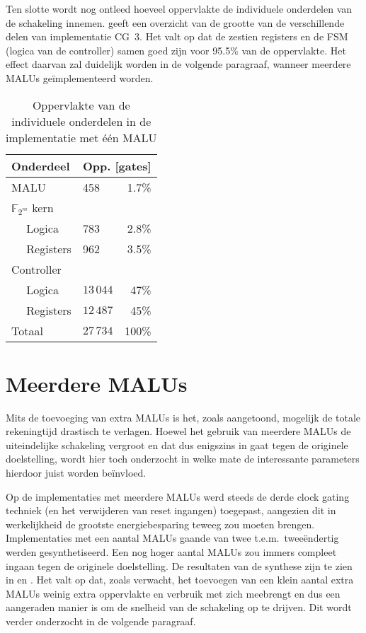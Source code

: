 Ten slotte wordt nog ontleed hoeveel oppervlakte de individuele onderdelen van de schakeling innemen.  geeft een overzicht van de grootte van de verschillende delen van implementatie CG~3. Het valt op dat de zestien registers en de FSM (logica van de controller) samen goed zijn voor 95.5\% van de oppervlakte. Het effect daarvan zal duidelijk worden in de volgende paragraaf, wanneer meerdere MALUs ge\"implementeerd worden.

\begin{table}[h]
	\caption{Oppervlakte van de individuele onderdelen in de implementatie met \'e\'en MALU}
	\label{tabel-resultaten-onderdelen}

	\centering
	\begin{tabular}{llr}
		\toprule
		Onderdeel					& \multicolumn{2}{c}{Opp. [gates]}\\
		\midrule
		MALU				 			& 458			& 1.7\%\\
		$\mathbb{F}_{2^m}$ kern	&				& \\
		$\quad$ Logica				& 783			& 2.8\%\\
		$\quad$ Registers			& 962			& 3.5\%\\
		Controller					&				& \\
		$\quad$ Logica				& $13\,044$	& 47\%\\
		$\quad$ Registers			& $12\,487$	& 45\%\\
		\midrule
		Totaal						& $27\,734$	& 100\%\\
		\bottomrule		
	\end{tabular}
\end{table}


\section{Meerdere MALUs\label{sectie-resulaten-malus}}

Mits de toevoeging van extra MALUs is het, zoals aangetoond, mogelijk de totale rekeningtijd drastisch te verlagen. Hoewel het gebruik van meerdere MALUs de uiteindelijke schakeling vergroot en dat dus enigszins in gaat tegen de originele doelstelling, wordt hier toch onderzocht in welke mate de interessante parameters hierdoor juist worden be\"invloed.

Op de implementaties met meerdere MALUs werd steeds de derde clock gating techniek (en het verwijderen van reset ingangen) toegepast, aangezien dit in werkelijkheid de grootste energiebesparing teweeg zou moeten brengen. Implementaties met een aantal MALUs gaande van twee t.e.m.\ twee\"endertig werden gesynthetiseerd. Een nog hoger aantal MALUs zou immers compleet ingaan tegen de originele doelstelling. De resultaten van de synthese zijn te zien in  en . Het valt op dat, zoals verwacht, het toevoegen van een klein aantal extra MALUs weinig extra oppervlakte en verbruik met zich meebrengt en dus een aangeraden manier is om de snelheid van de schakeling op te drijven. Dit wordt verder onderzocht in de volgende paragraaf.

